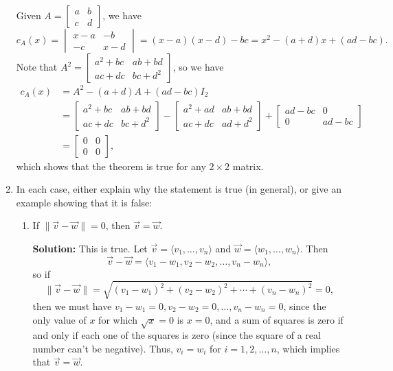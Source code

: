 \documentclass[letterpaper,12pt]{article}
\newcommand{\len}[1]{\lVert #1\rVert}
\begin{document}
\begin{enumerate}
Given $A=\begin{bmatrix}a&b\\c&d\end{bmatrix}$, we have
\[
c_A(x) = \begin{vmatrix}
x-a&-b\\-c&x-d
\end{vmatrix}=(x-a)(x-d)-bc = x^2-(a+d)x+(ad-bc).
\]
Note that $A^2=\begin{bmatrix}
a^2+bc&ab+bd\\ac+dc&bc+d^2
\end{bmatrix}$, so we have
\begin{align*}
c_A(x) &= A^2-(a+d)A+(ad-bc)I_2\\
& = \begin{bmatrix}
a^2+bc&ab+bd\\ac+dc&bc+d^2
\end{bmatrix} - \begin{bmatrix}
a^2+ad&ab+bd\\ac+dc&ad+d^2
\end{bmatrix}+\begin{bmatrix}
ad-bc&0\\0&ad-bc
\end{bmatrix}\\
&=\begin{bmatrix}
0&0\\0&0
\end{bmatrix},
\end{align*}
which shows that the theorem is true for any $2\times 2$ matrix.

\bigskip

\item In each case, either explain why the statement is true (in general), or give an example showing that it is false:
\begin{enumerate}
 \item If $\len{\vec{v}-\vec{w}}=0$, then $\vec{v}=\vec{w}$.
 
 \bigskip
 
 {\bf Solution:} This is true. Let $\vec{v}=\langle v_1,\ldots, v_n\rangle$ and $\vec{w} = \langle w_1,\ldots, w_n\rangle$. Then
 \[
 \vec{v}-\vec{w} = \langle v_1-w_1,v_2-w_2,\ldots, v_n-w_n\rangle,
 \]
so if
\[
\len{\vec{v}-\vec{w}} = \sqrt{(v_1-w_1)^2+(v_2-w_2)^2+\cdots + (v_n-w_n)^2} = 0,
\]
then we must have $v_1-w_1=0, v_2-w_2=0,\ldots, v_n-w_n=0$, since the only value of $x$ for which $\sqrt{x}=0$ is $x=0$, and a sum of squares is zero if and only if each one of the squares is zero (since the square of a real number can't be negative). Thus, $v_i=w_i$ for $i=1,2,\ldots, n$, which implies that $\vec{v}=\vec{w}$.


\end{enumerate}
\end{enumerate}
\end{document}
